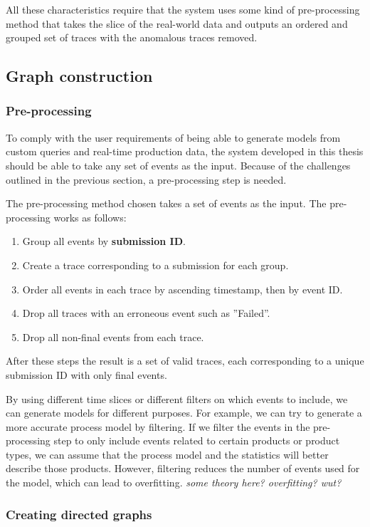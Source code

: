 \documentclass[english,12pt,a4paper,pdftex,sci,utf8]{aaltothesis}
\theoremstyle{definition}
\newcommand{\nyi}[1]{\noindent\colorbox{nyibg}{\textcolor{nyitext}{\emph{#1}}}}
\begin{document}
All these characteristics require that the system uses some kind of pre-processing method that takes the slice of the real-world data and outputs an ordered and grouped set of traces with the anomalous traces removed.

\subsection{Graph construction}

\subsubsection{Pre-processing}

To comply with the user requirements of being able to generate models from custom queries and real-time production data, the system developed in this thesis should be able to take any set of events as the input.
Because of the challenges outlined in the previous section, a pre-processing step is needed.

The pre-processing method chosen takes a set of events as the input. The pre-processing works as follows:
\begin{enumerate}
    \item Group all events by \textbf{submission ID}.
    \item Create a trace corresponding to a submission for each group.
    \item Order all events in each trace by ascending timestamp, then by event ID.
    \item Drop all traces with an erroneous event such as ''Failed''.
    \item Drop all non-final events from each trace.
\end{enumerate}
After these steps the result is a set of valid traces, each corresponding to a unique submission ID with only final events.

By using different time slices or different filters on which events to include, we can generate models for different purposes. 
For example, we can try to generate a more accurate process model by filtering.
If we filter the events in the pre-processing step to only include events related to certain products
or product types, we can assume that the process model and the statistics will better describe those products.
However, filtering reduces the number of events used for the model, which can lead to overfitting.
\nyi{some theory here? overfitting? wut?}

\subsubsection{Creating directed graphs}
\end{document}
